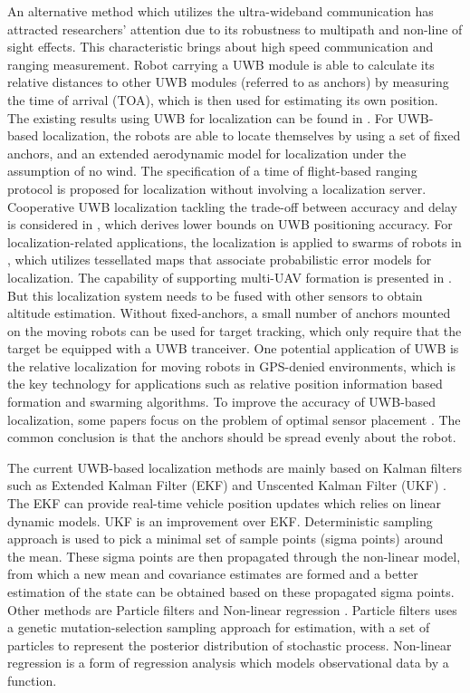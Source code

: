 \documentclass[journal]{IEEEtran}
\begin{document}
An alternative method which utilizes the ultra-wideband communication has attracted researchers' attention due to  its robustness to multipath and non-line of sight effects. This characteristic brings about high speed communication and  ranging measurement. Robot carrying a UWB module is able to calculate its relative distances to other UWB modules (referred to as anchors) by measuring the time of arrival (TOA), which is then used for estimating its own position. The existing results using UWB for localization can be found in \cite{Ledergerber:2015ur,J:2008wy,Alsindi:2009ig,Guo:2016ff,Dardari:2009dd}. For UWB-based localization, the robots \cite{Mueller:2015gm} are able to locate themselves by using a set of fixed anchors, and an extended aerodynamic model for localization under the assumption of no wind. The specification of a time of flight-based ranging protocol \cite{Dalce:2013gc} is proposed for localization without involving a localization server. Cooperative UWB localization tackling the trade-off between accuracy and delay is considered in \cite{Garcia:2014gt}, which derives lower bounds on UWB positioning accuracy. For localization-related applications, the localization is applied to swarms of robots in \cite{Prorok:2014jc}, which utilizes tessellated maps that associate probabilistic error models for localization.  The capability of supporting multi-UAV formation is presented in \cite{Anonymous:tWWRLPVI}. But this localization system needs to be fused with other sensors to obtain altitude estimation. Without fixed-anchors, a small number of anchors mounted on the moving robots can be used for target tracking\cite{Hepp:2016hq}, which only require that the target be equipped with a UWB tranceiver. One potential application of UWB is the relative localization for moving robots in GPS-denied environments, which is the key technology for applications such as relative position information based formation and swarming algorithms. To improve the accuracy of UWB-based localization, some papers focus on the problem of optimal sensor placement \cite{Bishop:2010kv, Martinez:2006ff, Isaacs:2009ub}. The common conclusion is that the anchors should be spread evenly about the robot.

The current UWB-based localization methods are mainly based on Kalman filters such as Extended Kalman Filter (EKF) and Unscented Kalman Filter (UKF) \cite{Benini:2012br, Anonymous:5gCbn1Jl,UmaMageswari:2012vd}. The EKF can provide real-time vehicle position updates which relies on linear dynamic models. UKF is an improvement over EKF. Deterministic sampling approach is used to pick a minimal set of sample points (sigma points) around the mean. These sigma points are then propagated through the non-linear model, from which a new mean and covariance estimates are formed and a better estimation of the state can be obtained based on these propagated sigma points. Other methods are Particle filters and Non-linear regression \cite{Anonymous:tWWRLPVI,Rai:2012tv,Youssef:2005tz}. Particle filters uses a genetic mutation-selection sampling approach for estimation, with a set of particles to represent the posterior distribution of stochastic process. Non-linear regression is a form of regression analysis which models observational data by a function. 
\end{document}
